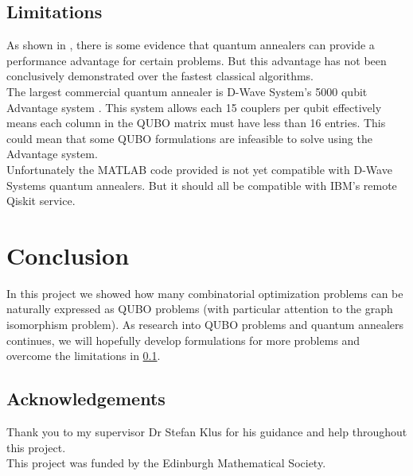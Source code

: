 \documentclass{article}
\begin{document}
\subsection{Limitations}
\label{sec:limitations}

As shown in \cite{tasseff2022emergingpotentialquantumannealing}, there is some evidence that quantum annealers can provide a performance advantage for certain problems. But this advantage has not been conclusively demonstrated over the fastest classical algorithms.\\

\noindent The largest commercial quantum annealer is D-Wave System's 5000 qubit Advantage system \cite{DWaveSystemsAdvantage}. This system allows each 15 couplers per qubit effectively means each column in the QUBO matrix must have less than 16 entries. This could mean that some QUBO formulations are infeasible to solve using the Advantage system.\\

\noindent Unfortunately the MATLAB code provided is not yet compatible with D-Wave Systems quantum annealers. But it should all be compatible with IBM's remote Qiskit service. 

\section{Conclusion}

In this project we showed how many combinatorial optimization problems can be naturally expressed as QUBO problems (with particular attention to the graph isomorphism problem). As research into QUBO problems and quantum annealers continues, we will hopefully develop formulations for more problems and overcome the limitations in \ref{sec:limitations}.  

\subsection{Acknowledgements}

\noindent Thank you to my supervisor Dr Stefan Klus for his guidance and help throughout this project.\\

\noindent This project was funded by the Edinburgh Mathematical Society. 

\newpage

\nocite{*}
\printbibliography %
\end{document}

